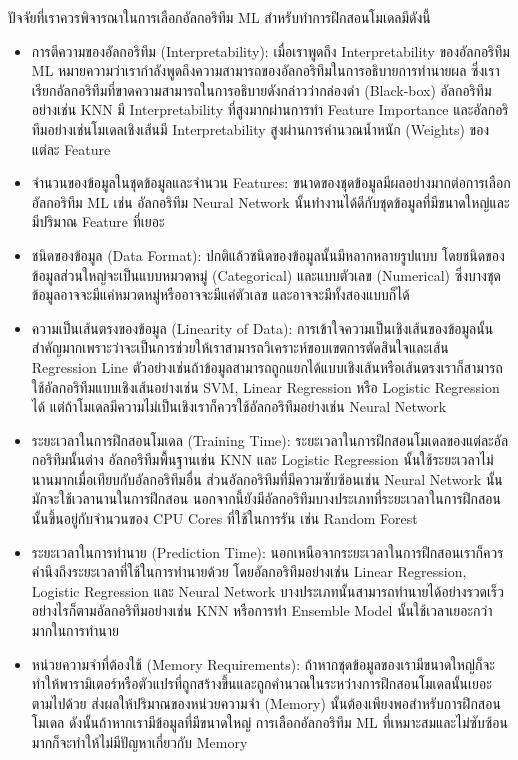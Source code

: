 ปัจจัยที่เราควรพิจารณาในการเลือกอัลกอริทึม ML สำหรับทำการฝึกสอนโมเดลมีดังนี้
%
\begin{itemize}[topsep=0pt,noitemsep]\setlength\itemsep{0.5em}
    \item การตีความของอัลกอริทึม (Interpretability): เมื่อเราพูดถึง Interpretability ของอัลกอริทึม ML หมายความว่าเรากำลังพูดถึงความสามารถของอัลกอริทึมในการอธิบายการทำนายผล ซึ่งเราเรียกอัลกอริทึมที่ขาดความสามารถในการอธิบายดังกล่าวว่ากล่องดำ (Black-box) อัลกอริทึมอย่างเช่น KNN มี Interpretability ที่สูงมากผ่านการทำ Feature Importance และอัลกอริทึมอย่างเช่นโมเดลเชิงเส้นมี Interpretability สูงผ่านการคำนวณน้ำหนัก (Weights) ของแต่ละ Feature

    \item จำนวนของข้อมูลในชุดข้อมูลและจำนวน Features: ขนาดของชุดข้อมูลมีผลอย่างมากต่อการเลือกอัลกอริทึม ML เช่น อัลกอริทึม Neural Network นั้นทำงานได้ดีกับชุดข้อมูลที่มีขนาดใหญ่และมีปริมาณ Feature ที่เยอะ

    \item ชนิดของข้อมูล (Data Format): ปกติแล้วชนิดของข้อมูลนั้นมีหลากหลายรูปแบบ โดยชนิดของข้อมูลส่วนใหญ่จะเป็นแบบหมวดหมู่ (Categorical) และแบบตัวเลข (Numerical) ซึ่งบางชุดข้อมูลอาจจะมีแค่หมวดหมู่หรืออาจจะมีแค่ตัวเลข และอาจจะมีทั้งสองแบบก็ได้

    \item ความเป็นเส้นตรงของข้อมูล (Linearity of Data): การเข้าใจความเป็นเชิงเส้นของข้อมูลนั้นสำคัญมากเพราะว่าจะเป็นการช่วยให้เราสามารถวิเคราะห์ขอบเขตการตัดสินใจและเส้น Regression Line ตัวอย่างเช่นถ้าข้อมูลสามารถถูกแยกได้แบบเชิงเส้นหรือเส้นตรงเราก็สามารถใช้อัลกอริทึมแบบเชิงเส้นอย่างเช่น SVM, Linear Regression หรือ Logistic Regression ได้ แต่ถ้าโมเดลมีความไม่เป็นเชิงเราก็ควรใช้อัลกอริทึมอย่างเช่น Neural Network

    \item ระยะเวลาในการฝึกสอนโมเดล (Training Time): ระยะเวลาในการฝึกสอนโมเดลของแต่ละอัลกอริทึมนั้นต่าง อัลกอริทึมพื้นฐานเช่น KNN และ Logistic Regression นั้นใช้ระยะเวลาไม่นานมากเมื่อเทียบกับอัลกอริทึมอื่น ส่วนอัลกอริทึมที่มีความซับซ้อนเช่น Neural Network นั้นมักจะใช้เวลานานในการฝึกสอน นอกจากนี้ยังมีอัลกอริทึมบางประเภทที่ระยะเวลาในการฝึกสอนนั้นขึ้นอยู่กับจำนวนของ CPU Cores ที่ใช้ในการรัน เช่น Random Forest

    \item ระยะเวลาในการทำนาย (Prediction Time): นอกเหนือจากระยะเวลาในการฝึกสอนเราก็ควรคำนึงถึงระยะเวลาที่ใช้ในการทำนายด้วย โดยอัลกอริทึมอย่างเช่น Linear Regression, Logistic Regression และ Neural Network บางประเภทนั้นสามารถทำนายได้อย่างรวดเร็ว อย่างไรก็ตามอัลกอริทึมอย่างเช่น KNN หรือการทำ Ensemble Model นั้นใช้เวลาเยอะกว่ามากในการทำนาย

    \item หน่วยความจำที่ต้องใช้ (Memory Requirements): ถ้าหากชุดข้อมูลของเรามีขนาดใหญ่ก็จะทำให้พารามิเตอร์หรือตัวแปรที่ถูกสร้างขึ้นและถูกคำนวณในระหว่างการฝึกสอนโมเดลนั้นเยอะตามไปด้วย ส่งผลให้ปริมาณของหน่วยความจำ (Memory) นั้นต้องเพียงพอสำหรับการฝึกสอนโมเดล ดังนั้นถ้าหากเรามีข้อมูลที่มีขนาดใหญ่ การเลือกอัลกอริทึม ML ที่เหมาะสมและไม่ซับซ้อนมากก็จะทำให้ไม่มีปัญหาเกี่ยวกับ Memory
\end{itemize}

